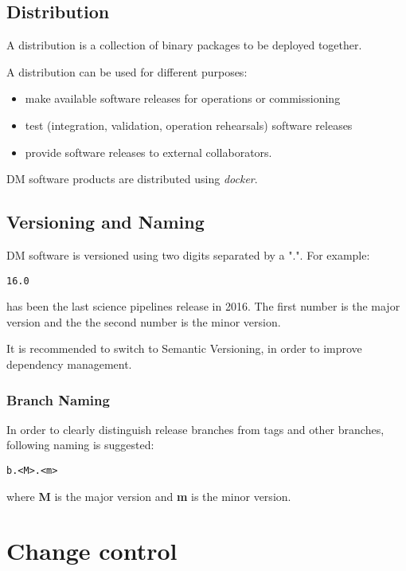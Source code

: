 \subsection{Distribution} \label{sect:distribution}

A distribution is a collection of binary packages to be deployed together.

A distribution can be used for different purposes:

\begin{itemize}
\item make available software releases for operations or commissioning
\item test (integration, validation, operation rehearsals) software releases
\item provide software releases to external collaborators.
\end{itemize}

DM software products are distributed using \textit{docker}.


\newpage
\subsection{Versioning and Naming} \label{sect:versioning}

DM software is versioned using two digits separated by a ".".
For example:

\begin{verbatim}
16.0
\end{verbatim}

has been the last science pipelines release in 2016. The first number is the major version and the the second number is the minor version. 


It is recommended to switch to Semantic Versioning, in order to improve dependency management.


\subsubsection{Branch Naming}

In order to clearly distinguish release branches from tags and other branches, following naming is suggested:

\begin{verbatim}
b.<M>.<m>
\end{verbatim}

where {\bf M} is the major version and {\bf m} is the minor version.


\newpage
\section{Change control} \label{sect:changecontrol}

